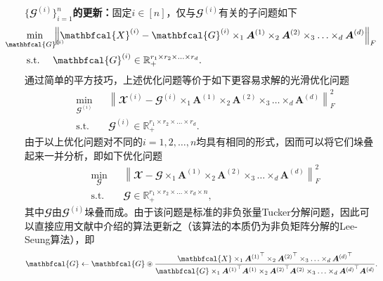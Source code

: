 \textbf{$\{\mathbfcal{G}^{(i)}\}_{i=1}^{n}$的更新：}固定$i\in[n]$，仅与$\mathbfcal{G}^{(i)}$有关的子问题如下
\begin{equation*}
    \begin{aligned}
    &\underset{\mathclap{\mathbfcal{G}^{(i)}}}{\min} &&\left\|\mathbfcal{X}^{(i)}-\mathbfcal{G}^{(i)} \times_{1} \boldsymbol{A}^{(1)} \times_{2} \boldsymbol{A}^{(2)} \times_{3} \ldots \times_{d} \boldsymbol{A}^{(d)}\right\|_{F} \\
    &\text{s.t.} && \mathbfcal{G}^{(i)}\in\mathbb{R}_{+}^{r_1 \times r_2 \times \ldots \times r_d}.
    \end{aligned}
\end{equation*}
通过简单的平方技巧，上述优化问题等价于如下更容易求解的光滑优化问题
\begin{equation*}
\begin{aligned}
    &\underset{{\mathbfcal{G}^{(i)}}}{\min} && \left\|\mathbfcal{X}^{(i)}-\mathbfcal{G}^{(i)} \times_{1} \boldsymbol{A}^{(1)}\times_{2} \boldsymbol{A}^{(2)}\times_{3}  \ldots \times_{d} \boldsymbol{A}^{(d)}\right\|_{F}^2 \\ &\text{s.t.} && \mathbfcal{G}^{(i)}\in\mathbb{R}_{+}^{r_1 \times r_2 \times \ldots \times r_d}.
\end{aligned}
\end{equation*}
由于以上优化问题对不同的$i=1,2,\ldots,n$均具有相同的形式，因而可以将它们垛叠起来一并分析，即如下优化问题
\begin{equation*}
\begin{aligned}
    &\underset{\mathbfcal{G}}{\min}&& \left\|\mathbfcal{X}-\mathbfcal{G} \times_{1} \boldsymbol{A}^{(1)} \times_{2} \boldsymbol{A}^{(2)}\times_{3} \ldots \times_{d} \boldsymbol{A}^{(d)}\right\|_{F}^2 \\ &\text{s.t.}&& \mathbfcal{G}\in\mathbb{R}_{+}^{r_1 \times r_2 \times \ldots \times r_d \times n},
\end{aligned}
\end{equation*}
其中$\mathbfcal{G}$由$\mathbfcal{G}^{(i)}$垛叠而成。由于该问题是标准的非负张量Tucker分解问题，因此可以直接应用文献中介绍的算法更新之（该算法的本质仍为非负矩阵分解的Lee-Seung算法），即
\begin{equation}\label{eq:l1-updateG}
	\mathbfcal{G} \leftarrow \mathbfcal{G} \oast \frac{\mathbfcal{X} \times_{1} {\boldsymbol{A}^{(1)}}^{\top}\times_{2} {\boldsymbol{A}^{(2)}}^{\top}\times_{3}  \ldots \times_{d} {\boldsymbol{A}^{(d)}}^{\top}}
	{\mathbfcal{G} \times_{1} {\boldsymbol{A}^{(1)}}^{\top} \boldsymbol{A}^{(1)} \times_{2} {\boldsymbol{A}^{(2)}}^{\top} \boldsymbol{A}^{(2)} \times_{3}  \ldots \times_{d} {\boldsymbol{A}^{(d)}}^{\top} \boldsymbol{A}^{(d)}}.
\end{equation}

